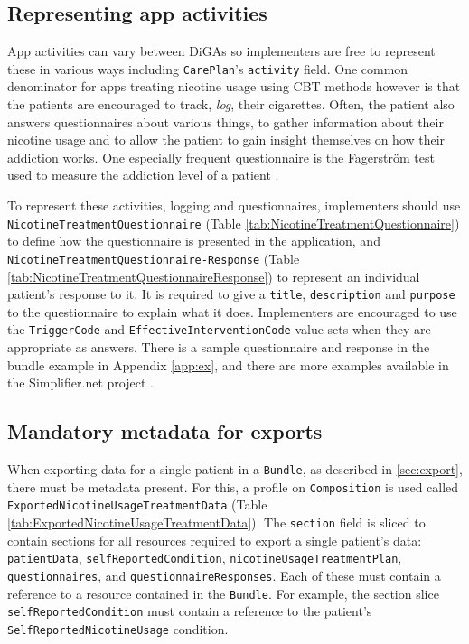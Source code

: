 \documentclass{report}
\def\code#1{\texttt{#1}} %
\newcommand{\tabquestionnaire}{}
\newcommand{\tabresponse}{}
\newcommand{\tabcomposition}{}
\begin{document}
\subsection{Representing app activities}
\tabquestionnaire
\tabresponse
App activities can vary between DiGAs so implementers are free to represent these in various ways including \code{CarePlan}'s \code{activity} field. 
One common denominator for apps treating nicotine usage using CBT methods however is that the patients are encouraged to track, \textit{log}, their cigarettes. 
Often, the patient also answers questionnaires about various things, to gather information about their nicotine usage and to allow the patient to gain insight themselves on how their addiction works.
One especially frequent questionnaire is the Fagerström test used to measure the addiction level of a patient \cite{fagerstrom}.

To represent these activities, logging and questionnaires, implementers should use \code{NicotineTreatmentQuestionnaire} (Table \ref{tab:NicotineTreatmentQuestionnaire}) to define how the questionnaire is presented in the application, 
and \code{NicotineTreatmentQuestionnaire-\allowbreak Response} (Table \ref{tab:NicotineTreatmentQuestionnaireResponse}) to represent an individual patient's response to it. It is required to give a \code{title}, \code{description} and \code{purpose} to the questionnaire to explain what it does.
Implementers are encouraged to use the \code{TriggerCode} and \code{EffectiveInterventionCode} value sets when they are appropriate as answers. There is a sample questionnaire and response in the bundle example in Appendix \ref{app:ex},
and there are more examples available in the Simplifier.net project \cite{project}.

\subsection{Mandatory metadata for exports}
\label{sec:comp}
\tabcomposition
When exporting data for a single patient in a \code{Bundle}, as described in \ref{sec:export}, there must be metadata present. 
For this, a profile on \code{Composition} is used called \code{ExportedNicotineUsageTreatmentData} (Table \ref{tab:ExportedNicotineUsageTreatmentData}).
The \code{section} field is sliced to contain sections for all resources required to export a single patient's data: 
\code{patientData}, \code{selfReportedCondition}, \code{nicotineUsageTreatmentPlan}, \code{questionnaires}, and \code{questionnaireResponses}.
Each of these must contain a reference to a resource contained in the \code{Bundle}. For example, the section slice \code{selfReportedCondition} must
contain a reference to the patient's \code{SelfReportedNicotineUsage} condition.
\end{document}
